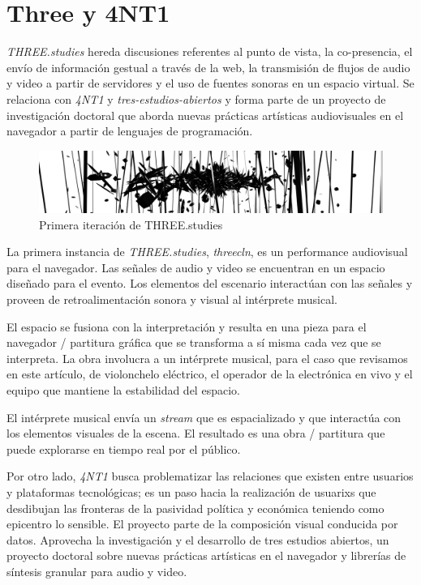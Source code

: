 
\section*{Three y 4NT1} %

\textit{THREE.studies} \citep{threestudies} hereda discusiones referentes al punto de vista, la co-presencia, el envío de información gestual a través de la web, la transmisión de flujos de audio y video a partir de servidores y el uso de fuentes sonoras en un espacio virtual. Se relaciona con \textit{4NT1} \citep{anti} y \textit{tres-estudios-abiertos} \citep{tresestudios} y forma parte de un proyecto de investigación doctoral que aborda nuevas prácticas artísticas audiovisuales en el navegador a partir de lenguajes de programación.  

\begin{figure}[H]
  \includegraphics[width=\textwidth]{img/three.png}
  \caption{Primera iteración de THREE.studies}
\end{figure}

La primera instancia de \textit{THREE.studies}, \textit{threecln}, es un performance audiovisual para el navegador. Las señales de audio y video se encuentran en un espacio diseñado para el evento. Los elementos del escenario interactúan con las señales y proveen de retroalimentación sonora y visual al intérprete musical.

El espacio se fusiona con la interpretación y resulta en una pieza para el navegador / partitura gráfica que se transforma a sí misma cada vez que se interpreta. La obra involucra a un intérprete musical, para el caso que revisamos en este artículo, de violonchelo eléctrico, el operador de la electrónica en vivo y el equipo que mantiene la estabilidad del espacio.

El intérprete musical envía un \textit{stream} que es espacializado y que interactúa con los elementos visuales de la escena. El resultado es una obra / partitura que puede explorarse en tiempo real por el público. 

Por otro lado, \textit{4NT1} busca problematizar las relaciones que existen entre usuarios y plataformas tecnológicas; es un paso hacia la realización de usuarixs que desdibujan las fronteras de la pasividad política y económica teniendo como epicentro lo sensible. El proyecto parte de la composición visual conducida por datos. Aprovecha la investigación y el desarrollo de tres estudios abiertos, un proyecto doctoral sobre nuevas prácticas artísticas en el navegador y librerías de síntesis granular para audio y video.

